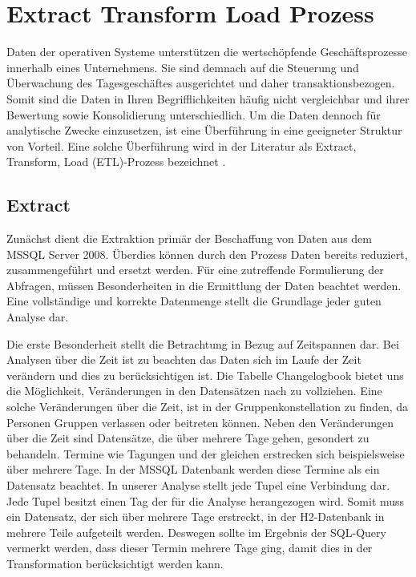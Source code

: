 \section{Extract Transform Load Prozess}

Daten der operativen Systeme unterstützen die wertschöpfende Geschäftsprozesse innerhalb eines Unternehmens. Sie sind demnach auf die Steuerung und Überwachung des Tagesgeschäftes ausgerichtet und daher transaktionsbezogen. Somit sind die Daten in Ihren Begrifflichkeiten häufig nicht vergleichbar und ihrer Bewertung sowie Konsolidierung unterschiedlich. Um die Daten dennoch für analytische Zwecke einzusetzen, ist eine Überführung in eine geeigneter Struktur von Vorteil. Eine solche Überführung wird in der Literatur als Extract, Transform, Load (ETL)-Prozess bezeichnet \cite{ElSappagh201191}. 

\subsection{Extract}

Zunächst dient die Extraktion primär der Beschaffung von Daten aus dem MSSQL Server 2008. Überdies können durch den Prozess Daten bereits reduziert,  zusammengeführt und ersetzt werden. Für eine zutreffende Formulierung der Abfragen, müssen Besonderheiten in die Ermittlung der Daten beachtet werden. Eine vollständige und korrekte Datenmenge stellt die Grundlage jeder guten Analyse dar.

Die erste Besonderheit stellt die Betrachtung in Bezug auf Zeitspannen dar. Bei Analysen über die Zeit ist zu beachten das Daten sich im Laufe der Zeit verändern und dies zu berücksichtigen ist. Die Tabelle Changelogbook bietet uns die Möglichkeit, Veränderungen in den Datensätzen nach zu vollziehen. Eine solche Veränderungen über die Zeit, ist in der Gruppenkonstellation zu finden, da Personen Gruppen verlassen oder beitreten können. Neben den Veränderungen über die Zeit sind Datensätze, die über mehrere Tage gehen, gesondert zu behandeln. Termine wie Tagungen und der gleichen erstrecken sich beispielsweise über mehrere Tage. In der MSSQL Datenbank werden diese Termine als ein Datensatz beachtet. In unserer Analyse stellt jede Tupel eine Verbindung dar. Jede Tupel besitzt einen Tag der für die Analyse herangezogen wird. Somit muss ein Datensatz, der sich über mehrere Tage erstreckt, in der H2-Datenbank in mehrere Teile aufgeteilt werden. Deswegen sollte im Ergebnis der SQL-Query vermerkt werden, dass dieser Termin mehrere Tage ging, damit dies in der Transformation berücksichtigt werden kann. 

